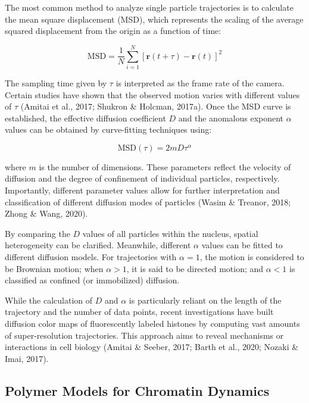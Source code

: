 The most common method to analyze single particle trajectories is to calculate the mean square displacement (MSD), which represents the scaling of the average squared displacement from the origin as a function of time:

\begin{equation}
\text{MSD} = \frac{1}{N} \sum_{i=1}^{N} \left[ \mathbf{r}(t + \tau) - \mathbf{r}(t) \right]^2
\end{equation}

The sampling time given by $\tau$ is interpreted as the frame rate of the camera. Certain studies have shown that the observed motion varies with different values of $\tau$ (Amitai et al., 2017; Shukron \& Holcman, 2017a). Once the MSD curve is established, the effective diffusion coefficient $D$ and the anomalous exponent $\alpha$ values can be obtained by curve-fitting techniques using:

\begin{equation}
\text{MSD}(\tau) = 2mD\tau^\alpha
\end{equation}

where $m$ is the number of dimensions. These parameters reflect the velocity of diffusion and the degree of confinement of individual particles, respectively. Importantly, different parameter values allow for further interpretation and classification of different diffusion modes of particles (Wasim \& Treanor, 2018; Zhong \& Wang, 2020).

By comparing the $D$ values of all particles within the nucleus, spatial heterogeneity can be clarified. Meanwhile, different $\alpha$ values can be fitted to different diffusion models. For trajectories with $\alpha = 1$, the motion is considered to be Brownian motion; when $\alpha > 1$, it is said to be directed motion; and $\alpha < 1$ is classified as confined (or immobilized) diffusion.

While the calculation of $D$ and $\alpha$ is particularly reliant on the length of the trajectory and the number of data points, recent investigations have built diffusion color maps of fluorescently labeled histones by computing vast amounts of super-resolution trajectories. This approach aims to reveal mechanisms or interactions in cell biology (Amitai \& Seeber, 2017; Barth et al., 2020; Nozaki \& Imai, 2017).

\subsection{Polymer Models for Chromatin Dynamics}

